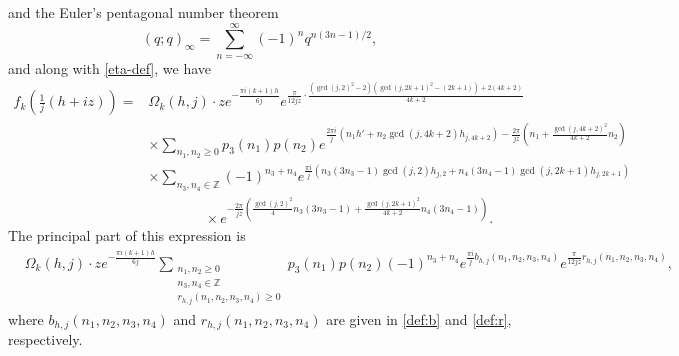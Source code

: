 \documentclass[12pt]{article}
\numberwithin{equation}{section}
\begin{document}
and the Euler's pentagonal number theorem \cite[(1.3.1)]{Andrews-1976}
\begin{equation*}
(q;q)_{\infty}=\sum_{n=-\infty}^{\infty}(-1)^nq^{n(3n-1)/2},
\end{equation*}
and along with \eqref{eta-def}, we have
\begin{align*}
f_{k}\left(\frac{1}{j}(h+i z)\right)
=&\Omega_{k}(h,j)\cdot ze^{-\frac{\pi i(k+1)h}{6j}}e^{\frac{\pi }{12jz}\cdot\frac{\left(\gcd(j,2)^2-2\right)\left(\gcd(j,2k+1)^2
-(2k+1)\right)+2(4k+2)}{4k+2}}
\\
&\times \sum_{n_1,n_2\geq 0}p_3(n_1)p(n_2)e^{\frac{2\pi i}{j}\left(n_1 h'+n_2\gcd(j,4k+2)h_{j,4k+2}\right)-\frac{2\pi }{jz}\left(n_1+\frac{\gcd(j,4k+2)^2}{4k+2}n_2\right)}
\\
&\times \sum_{n_3,n_4\in \mathbb{Z}}(-1)^{n_3+n_4}
e^{\frac{\pi i}{j}\left(n_3(3n_3-1)\gcd(j,2)h_{j,2}
+n_4(3n_4-1)\gcd(j,2k+1)h_{j,2k+1}\right)}
\\
&\qquad\qquad \times e^{-\frac{2\pi }{jz}\left(\frac{\gcd(j,2)^2}{4}n_3(3n_3-1)
+\frac{\gcd(j,2k+1)^2}{4k+2}n_4(3n_4-1)\right)}.
\end{align*}
The principal part of this expression is
\begin{align*}
&\Omega_{k}(h,j)\cdot ze^{-\frac{\pi i(k+1)h}{6j}}\sum_{\substack{n_1,n_2\geq 0 \\ n_3,n_4\in \mathbb{Z} \\r_{h,j}(n_1,n_2,n_3,n_4)\geq 0}}p_3(n_1)p(n_2)(-1)^{n_3+n_4}
e^{\frac{\pi i}{j}b_{h,j}(n_1,n_2,n_3,n_4)}e^{\frac{\pi }{12jz}r_{h,j}(n_1,n_2,n_3,n_4)},
\end{align*}
where
$b_{h,j}(n_1,n_2,n_3,n_4)$ and $r_{h,j}(n_1,n_2,n_3,n_4)$ are given in \eqref{def:b} and \eqref{def:r}, respectively.
\end{document}
